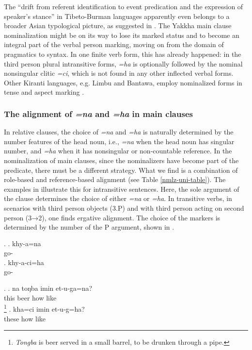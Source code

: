 The “drift from referent identification to event predication and the expression of speaker’s stance” in Tibeto-Burman languages apparently even belongs to a broader Asian typological picture, as suggested in \citet{Yapetal2010_Non-referential}. The Yakkha main clause nominalization might be on its way to lose its marked status and to become an integral part of the verbal person marking, moving on from the domain of pragmatics to syntax. In one finite verb form, this has already happened: in the third person plural intransitive forms, \emph{=ha} is optionally followed by the nominal nonsingular clitic \emph{=ci}, which is not found in any other inflected verbal forms. Other Kiranti languages, e.g. Limbu and Bantawa, employ nominalized forms in tense and aspect marking \citep{Driem1993Einige, Doornenbal2008_Nominalization}. 



\subsubsection{The alignment of \emph{=na} and \emph{=ha} in main clauses}

In relative clauses, the choice of  \emph{=na} and \emph{=ha} is naturally determined by the number features of the head noun, i.e., \emph{=na} when the head noun has singular number, and \emph{=ha} when it has nonsingular or non-countable reference. In the nominalization of main clauses, since the nominalizers have become part of the predicate, there must be a different strategy.  What we find is a combination of role-based and reference-based alignment (see Table \ref{nmlz-uni-table}). The examples in  \Next illustrate this for intransitive sentences. Here, the sole argument of the clause determines the choice of either  \emph{=na} or \emph{=ha}. In transitive verbs, in scenarios with third person objects (3.P) and with third person acting on second person (3→2), one finds ergative alignment. The choice of the markers is determined by the number of the P argument, shown in  \NNext. 


\ex. \ag. khy-a=na\\
go-\\
\bg. khy-a-ci=ha\\
go-\\


\ex.  \ag. 	na toŋba imin et-u-ga=na?\\
			this beer how like\\
			\footnote{\emph{Tongba} is  beer served in a small barrel, to be drunken through a pipe.}
	\bg.	kha=ci imin et-u-g=ha?\\
			these how like\\ 




